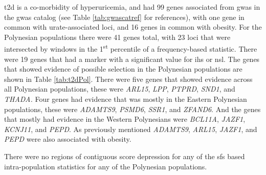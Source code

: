 \documentclass[twoside,openright]{report}
\begin{document}
\Gls{t2d} is a co-morbidity of hyperuricemia, and had 99 genes
associated from \gls{gwas} in the \gls{gwas} catalog (see Table
\ref{tab:gwascatref} for references), with one gene in common with
urate-associated loci, and 16 genes in common with obesity. For the
Polynesian populations there were 41 genes total, with 23 loci that were
intersected by windows in the 1\textsuperscript{st} percentile of a
frequency-based statistic. There were 19 genes that had a marker with a
significant value for \gls{ihs} or \gls{nsl}. The genes that showed
evidence of possible selection in the Polynesian populations are shown
in Table \ref{tab:t2dPol}. There were five genes that showed evidence
across all Polynesian populations, these were \emph{ARL15}, \emph{LPP},
\emph{PTPRD}, \emph{SND1}, and \emph{THADA.} Four genes had evidence
that was mostly in the Eastern Polynesian populations, these were
\emph{ADAMTS9}, \emph{PSMD6}, \emph{SSR1}, and \emph{ZFAND6}. And the
genes that mostly had evidence in the Western Polynesians were
\emph{BCL11A}, \emph{JAZF1}, \emph{KCNJ11}, and \emph{PEPD}. As
previously mentioned \emph{ADAMTS9}, \emph{ARL15}, \emph{JAZF1}, and
\emph{PEPD} were also associated with obesity.

There were no regions of contiguous score depression for any of the
\gls{sfs} based intra-population statistics for any of the Polynesian
populations.

\begingroup\fontsize{8}{10}\selectfont
\end{document}
